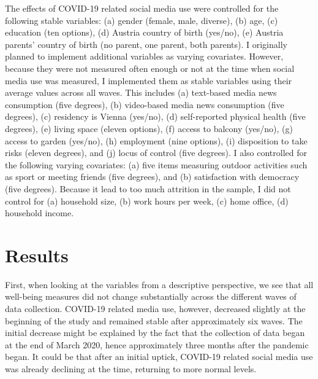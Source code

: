\documentclass[
  english,
  man,mask,floatsintext]{apa6}
\begin{document}
The effects of COVID-19 related social media use were controlled for the following stable variables:
(a) gender (female, male, diverse), (b) age, (c) education (ten options), (d) Austria country of birth (yes/no), (e) Austria parents' country of birth (no parent, one parent, both parents).
I originally planned to implement additional variables as varying covariates.
However, because they were not measured often enough or not at the time when social media use was measured, I implemented them as stable variables using their average values across all waves.
This includes (a) text-based media news consumption (five degrees), (b) video-based media news consumption (five degrees), (c) residency is Vienna (yes/no), (d) self-reported physical health (five degrees), (e) living space (eleven options), (f) access to balcony (yes/no), (g) access to garden (yes/no), (h) employment (nine options), (i) disposition to take risks (eleven degrees), and (j) locus of control (five degrees).
I also controlled for the following varying covariates: (a) five items measuring outdoor activities such as sport or meeting friends (five degrees), and (b) satisfaction with democracy (five degrees).
Because it lead to too much attrition in the sample, I did not control for (a) household size, (b) work hours per week, (c) home office, (d) household income.

\hypertarget{results}{%
\section{Results}\label{results}}

First, when looking at the variables from a descriptive perspective, we see that all well-being measures did not change substantially across the different waves of data collection.
COVID-19 related media use, however, decreased slightly at the beginning of the study and remained stable after approximately six waves.
The initial decrease might be explained by the fact that the collection of data began at the end of March 2020, hence approximately three months after the pandemic began.
It could be that after an initial uptick, COVID-19 related social media use was already declining at the time, returning to more normal levels.
\end{document}
